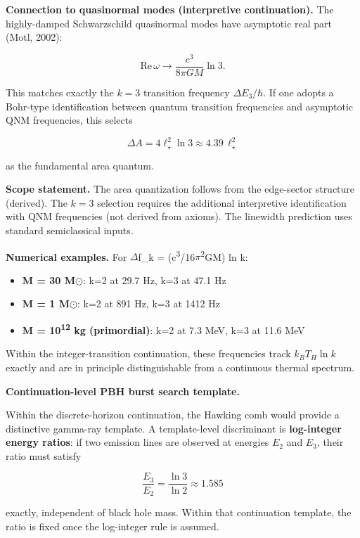\textbf{Connection to quasinormal modes (interpretive continuation).} The highly-damped Schwarzschild quasinormal modes have asymptotic real part (Motl, 2002):

\[
\mathrm{Re}\,\omega \to \frac{c^3}{8\pi G M} \ln 3.
\]

This matches exactly the \(k = 3\) transition frequency \(\Delta E_3 / \hbar\). If one adopts a Bohr-type identification between quantum transition frequencies and asymptotic QNM frequencies, this selects

\[
\Delta A = 4\ell_\star^2 \ln 3 \approx 4.39 \, \ell_\star^2
\]

as the fundamental area quantum.

\textbf{Scope statement.} The area quantization follows from the edge-sector structure (derived). The \(k = 3\) selection requires the additional interpretive identification with QNM frequencies (not derived from axioms). The linewidth prediction uses standard semiclassical inputs.

\textbf{Numerical examples.} For \ensuremath{\Delta}f\_k = (c\textsuperscript{3}/16\ensuremath{\pi}\textsuperscript{2}GM) ln k:

\begin{itemize}
\tightlist
\item
  \textbf{M = 30 M\ensuremath{\odot}}: k=2 at 29.7 Hz, k=3 at 47.1 Hz
\item
  \textbf{M = 1 M\ensuremath{\odot}}: k=2 at 891 Hz, k=3 at 1412 Hz
\item
  \textbf{M = 10\textsuperscript{1}\textsuperscript{2} kg (primordial)}: k=2 at 7.3 MeV, k=3 at 11.6 MeV
\end{itemize}

Within the integer-transition continuation, these frequencies track \(k_B T_H \ln k\) exactly and are in principle distinguishable from a continuous thermal spectrum.

\textbf{Continuation-level PBH burst search template.}

Within the discrete-horizon continuation, the Hawking comb would provide a distinctive gamma-ray template. A template-level discriminant is \textbf{log-integer energy ratios}: if two emission lines are observed at energies \(E_2\) and \(E_3\), their ratio must satisfy

\[
\frac{E_3}{E_2} = \frac{\ln 3}{\ln 2} \approx 1.585
\]

exactly, independent of black hole mass. Within that continuation template, the ratio is fixed once the log-integer rule is assumed.


